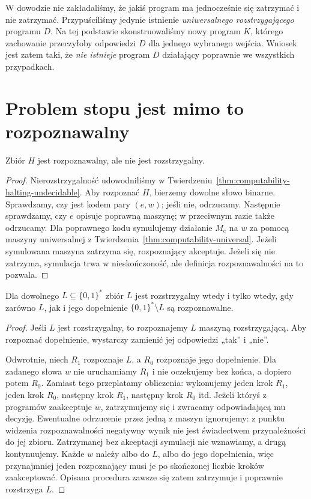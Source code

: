 \begin{uwaga}
W dowodzie nie zakładaliśmy, że jakiś program
ma jednocześnie się zatrzymać i nie zatrzymać.
Przypuściliśmy jedynie istnienie \emph{uniwersalnego
rozstrzygającego} programu $D$. Na tej podstawie
skonstruowaliśmy nowy program $K$, którego zachowanie
przeczyłoby odpowiedzi $D$ dla jednego wybranego wejścia.
Wniosek jest zatem taki, że \emph{nie istnieje} program
$D$ działający poprawnie we wszystkich przypadkach.
\end{uwaga}

\section{Problem stopu jest mimo to rozpoznawalny}
\begin{twierdzenie}\label{thm:computability-halting-recognizable}
Zbiór $H$ jest rozpoznawalny, ale nie jest rozstrzygalny.
\end{twierdzenie}
\begin{proof}
Nierozstrzygalność udowodniliśmy w
Twierdzeniu~\ref{thm:computability-halting-undecidable}.
Aby rozpoznać $H$, bierzemy dowolne słowo binarne.
Sprawdzamy, czy jest kodem pary $(e,w)$; jeśli nie,
odrzucamy. Następnie sprawdzamy, czy $e$ opisuje
poprawną maszynę; w przeciwnym razie także odrzucamy.
Dla poprawnego kodu symulujemy działanie $M_e$ na $w$
za pomocą maszyny uniwersalnej z
Twierdzenia~\ref{thm:computability-universal}.
Jeżeli symulowana maszyna zatrzyma się,
rozpoznający akceptuje. Jeżeli się nie zatrzyma,
symulacja trwa w nieskończoność, ale definicja
rozpoznawalności na to pozwala.
\end{proof}

\begin{twierdzenie}\label{thm:computability-two-recognizers}
Dla dowolnego $L\subseteq\{0,1\}^*$ zbiór $L$
jest rozstrzygalny wtedy i tylko wtedy, gdy zarówno
$L$, jak i jego dopełnienie $\{0,1\}^*\setminus L$
są rozpoznawalne.
\end{twierdzenie}
\begin{proof}
Jeśli $L$ jest rozstrzygalny, to rozpoznajemy $L$
maszyną rozstrzygającą. Aby rozpoznać dopełnienie,
wystarczy zamienić jej odpowiedzi „tak” i „nie”.

Odwrotnie, niech $R_1$ rozpoznaje $L$, a $R_0$
rozpoznaje jego dopełnienie. Dla zadanego słowa $w$
nie uruchamiamy $R_1$ i nie oczekujemy bez końca,
a dopiero potem $R_0$. Zamiast tego przeplatamy obliczenia:
wykonujemy jeden krok $R_1$, jeden krok $R_0$,
następny krok $R_1$, następny krok $R_0$ itd.
Jeżeli któryś z programów zaakceptuje $w$,
zatrzymujemy się i zwracamy odpowiadającą mu decyzję.
Ewentualne odrzucenie przez jedną z maszyn ignorujemy:
z punktu widzenia rozpoznawalności negatywny wynik
nie jest świadectwem przynależności do jej zbioru.
Zatrzymanej bez akceptacji symulacji nie wznawiamy,
a drugą kontynuujemy.
Każde $w$ należy albo do $L$, albo do jego dopełnienia,
więc przynajmniej jeden rozpoznający musi je po skończonej
liczbie kroków zaakceptować. Opisana procedura
zawsze się zatem zatrzymuje i poprawnie rozstrzyga $L$.
\end{proof}

